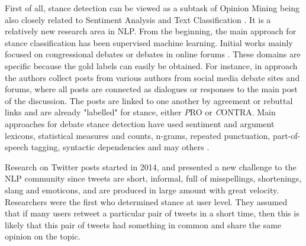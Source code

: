 \documentclass[10pt, a4paper]{article}
\begin{document}
First of all, stance detection can be viewed as a subtask of Opinion Mining being also closely related to Sentiment Analysis \cite{pang2008opinion} and Text Classification \cite{aggarwal2012survey}. It is a relatively new research area in NLP. From the beginning, the main approach for stance classification has been supervised machine learning. Initial works mainly focused on congressional debates \cite{Thomas06a} or debates in online forums \cite{somasundaran-wiebe-2009-recognizing,murakami-raymond-2010-support,Anand:2011:CRD:2107653.2107654,walker-etal-2012-stance,hasan-ng-2014-taking,sridhar-etal-2014-collective}. These domains are specific because the gold labels can easily be obtained. For instance, in \cite{sridhar-etal-2014-collective} approach the authors collect posts from various authors from social media debate sites and forums, where all posts are connected as dialogues or responses to the main post of the discussion. The posts are linked to one another by agreement or rebuttal links and are already "labelled" for stance, either {\emph PRO} or {\emph CONTRA}. Main approaches for debate stance detection have used sentiment and argument lexicons, statistical measures and counts, n-grams, repeated punctuation, part-of-speech tagging, syntactic dependencies and may others \cite{Wang8672602}.

Research on Twitter posts started in 2014, and presented a new challenge to the NLP community since tweets are short, informal, full of misspellings, shortenings, slang and emoticons, and are produced in large amount with great velocity. Researchers \cite{DBLP:journals/corr/RajadesinganL14} were the first who determined stance at user level. They assumed that if many users retweet a particular pair of tweets in a short time, then this is likely that this pair of tweets had something in common and share the same opinion on the topic. 
\end{document}
